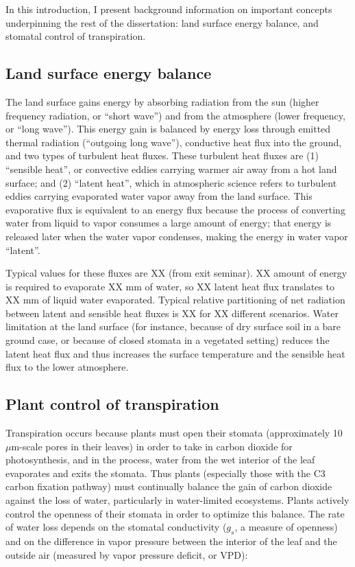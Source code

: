 In this introduction, I present background information on important concepts underpinning the rest of the dissertation: land surface energy balance, and stomatal control of transpiration.

\subsection{Land surface energy balance}

The land surface gains energy by absorbing radiation from the sun (higher frequency radiation, or ``short wave'') and from the atmosphere (lower frequency, or ``long wave'').  This energy gain is balanced by energy loss through emitted thermal radiation (``outgoing long wave''), conductive heat flux into the ground, and two types of turbulent heat fluxes.  These turbulent heat fluxes are (1) ``sensible heat'', or convective eddies carrying warmer air away from a hot land surface; and (2) ``latent heat'', which in atmospheric science refers to turbulent eddies carrying evaporated water vapor away from the land surface.  This evaporative flux is equivalent to an energy flux because the process of converting water from liquid to vapor consumes a large amount of energy; that energy is released later when the water vapor condenses, making the energy in water vapor ``latent''.

Typical values for these fluxes are XX (from exit seminar).  XX amount of energy is required to evaporate XX mm of water, so XX latent heat flux translates to XX mm of liquid water evaporated.  Typical relative partitioning of net radiation between latent and sensible heat fluxes is XX for XX different scenarios.  Water limitation at the land surface (for instance, because of dry surface soil in a bare ground case, or because of closed stomata in a vegetated setting) reduces the latent heat flux and thus increases the surface temperature and the sensible heat flux to the lower atmosphere.

\subsection{Plant control of transpiration}

Transpiration occurs because plants must open their stomata (approximately 10 $\mu$m-scale pores in their leaves) in order to take in carbon dioxide for photosynthesis, and in the process, water from the wet interior of the leaf evaporates and exits the stomata.  Thus plants (especially those with the C3 carbon fixation pathway) must continually balance the gain of carbon dioxide against the loss of water, particularly in water-limited ecosystems.  Plants actively control the openness of their stomata in order to optimize this balance.  The rate of water loss depends on the stomatal conductivity ($g_s$, a measure of openness) and on the difference in vapor pressure between the interior of the leaf and the outside air (measured by vapor pressure deficit, or VPD):

